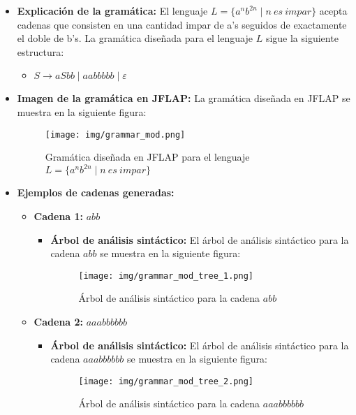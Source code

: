 \documentclass[11pt]{report}
\begin{document}
\begin{itemize}
  \item \textbf{Explicación de la gramática:} El lenguaje $L = \{a^n b^{2n} \mid n \ es \ impar\}$ acepta cadenas que consisten en una cantidad impar de a's seguidos de exactamente el doble de b's. La gramática diseñada para el lenguaje $L$ sigue la siguiente estructura:
  \begin{itemize}
    \item $S \rightarrow aSbb \mid aabbbbb \mid \varepsilon$
  \end{itemize}
  \item \textbf{Imagen de la gramática en JFLAP:} La gramática diseñada en JFLAP se muestra en la siguiente figura:
  \begin{figure}[H]
    \centering
    \texttt{[image: img/grammar\_mod.png]}
    \caption{Gramática diseñada en JFLAP para el lenguaje $L = \{a^n b^{2n} \mid n \ es \ impar\}$}
  \end{figure}

    \newpage
  
  \item \textbf{Ejemplos de cadenas generadas:}
  \begin{itemize}
    \item \textbf{Cadena 1:} $abb$
    \begin{itemize}
      \item \textbf{Árbol de análisis sintáctico:} El árbol de análisis sintáctico para la cadena $abb$ se muestra en la siguiente figura:
      \begin{figure}[H]
        \centering
        \texttt{[image: img/grammar\_mod\_tree\_1.png]}
        \caption{Árbol de análisis sintáctico para la cadena $abb$}
        \label{fig:arbol10_mod}
      \end{figure}
    \end{itemize}

    \newpage

    \item \textbf{Cadena 2:} $aaabbbbbb$
    \begin{itemize}
      \item \textbf{Árbol de análisis sintáctico:} El árbol de análisis sintáctico para la cadena $aaabbbbbb$ se muestra en la siguiente figura:
      \begin{figure}[H]
        \centering
        \texttt{[image: img/grammar\_mod\_tree\_2.png]}
        \caption{Árbol de análisis sintáctico para la cadena $aaabbbbbb$}
        \label{fig:arbol11_mod}
      \end{figure}
    \end{itemize}


\end{itemize}
\end{itemize}
\end{document}
